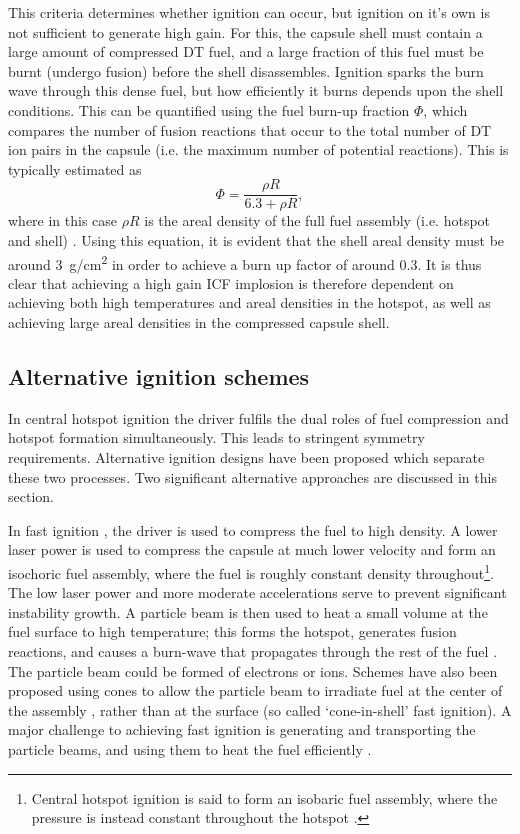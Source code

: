 This criteria determines whether ignition can occur, but ignition on it's own is not sufficient to generate high gain. For this, the capsule shell must contain a large amount of compressed DT fuel, and a large fraction of this fuel must be burnt (undergo fusion) before the shell disassembles. Ignition sparks the burn wave through this dense fuel, but how efficiently it burns depends upon the shell conditions. This can be quantified using the fuel burn-up fraction $\Phi$, which compares the number of fusion reactions that occur to the total number of DT ion pairs in the capsule (i.e. the maximum number of potential reactions). This is typically estimated as 
\begin{equation} \Phi = \frac{ \rho R} {6.3 + \rho R}, \end{equation}
where in this case $\rho R$ is the areal density of the full fuel assembly (i.e. hotspot and shell) \cite{Fraley1974}. Using this equation, it is evident that the shell areal density must be around 3~\si[per-mode=symbol]{\gram\per\centi\meter\squared} in order to achieve a burn up factor of around 0.3. It is thus clear that achieving a high gain ICF implosion is therefore dependent on achieving both high temperatures and areal densities in the hotspot, as well as achieving large areal densities in the compressed capsule shell.

\subsection{Alternative ignition schemes}
In central hotspot ignition the driver fulfils the dual roles of fuel compression and hotspot formation simultaneously. This leads to stringent symmetry requirements. Alternative ignition designs have been proposed which separate these two processes. Two significant alternative approaches are discussed in this section.

In fast ignition \cite{Tabak1994}, the driver is used to compress the fuel to high density. A lower laser power is used to compress the capsule at much lower velocity and form an isochoric fuel assembly, where the fuel is roughly constant density throughout\footnote{Central hotspot ignition is said to form an isobaric fuel assembly, where the pressure is instead constant throughout the hotspot \cite{Atzeni2008}.}. The low laser power and more moderate accelerations serve to prevent significant instability growth. A particle beam is then used to heat a small volume at the fuel surface to high temperature; this forms the hotspot, generates fusion reactions, and causes a burn-wave that propagates through the rest of the fuel \cite{Tabak2005, Tabak2006}. The particle beam could be formed of electrons or ions. Schemes have also been proposed using cones to allow the particle beam to irradiate fuel at the center of the assembly \cite{Kodama2002, Kitagawa2002}, rather than at the surface (so called `cone-in-shell' fast ignition). A major challenge to achieving fast ignition is generating and transporting the particle beams, and using them to heat the fuel efficiently \cite{Norreys2014}.

